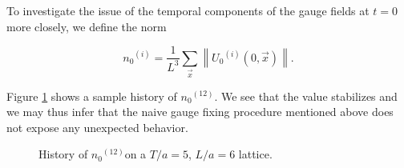 \documentclass[a4paper]{scrartcl}
\newcommand{\ord}[1]{\ensuremath{^{(#1)}}}
\begin{document}
To investigate the issue of the temporal components of the gauge
fields at $t=0$ more closely, we define the norm

\begin{equation}
  \label{eq:18}
  n_0\ord i = \frac 1 {L^3} \sum_{\vec x}\left\| U_0 \ord i(0, \vec
    x) \right\|.
\end{equation}

Figure \ref{fig:n0nor} shows a sample history of $n_0\ord {12}$. We
see that the value stabilizes and we may thus infer that the naive
gauge fixing procedure mentioned above does not expose any unexpected
behavior.

\begin{figure}
  \centering
  
  \caption{History of $n_0\ord {12} $on a $T/a = 5$, 
    $L/a = 6$ lattice.}
  \label{fig:n0nor}
\end{figure}



\end{document}
